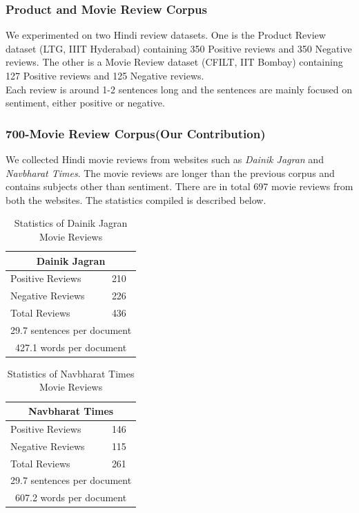\documentclass[11pt,a4paper]{article}
\begin{document}
\subsubsection{Product and Movie Review Corpus}
We experimented on two Hindi review datasets. One is the Product Review dataset (LTG, IIIT Hyderabad) containing 350 Positive reviews and 350 Negative reviews. The other is a Movie Review dataset (CFILT, IIT Bombay) containing 127 Positive reviews and 125 Negative reviews.\\
Each review is around 1-2 sentences long and the sentences are mainly focused on sentiment, either positive or negative.

\subsubsection{700-Movie Review Corpus(Our Contribution)}
\label{new_reviews}
We collected Hindi movie reviews from websites such as \emph{Dainik Jagran} and \emph{Navbharat Times}. The movie reviews are longer than the previous corpus and contains subjects other than sentiment.
There are in total 697 movie reviews from both the websites. The statistics compiled is described below.\\

\begin {table}[h!]
\large
\centering
\begin{tabular}{ |l|l| }
\hline
\multicolumn{2}{|c|}{\textbf{Dainik Jagran}} \\
\hline
Positive Reviews & 210 \\ 
Negative Reviews & 226 \\
Total Reviews & 436\\ \hline
\multicolumn{2}{|c|}{29.7 sentences per document} \\ \hline
\multicolumn{2}{|c|}{427.1 words per document} \\
\hline
\end{tabular}
\caption {Statistics of Dainik Jagran Movie Reviews}
\end{table}

\begin {table}[h!]
\large
\centering
\begin{tabular}{ |l|l| }
\hline
\multicolumn{2}{|c|}{\textbf{Navbharat Times}} \\
\hline
Positive Reviews & 146 \\ 
Negative Reviews & 115 \\
Total Reviews & 261\\ \hline
\multicolumn{2}{|c|}{29.7 sentences per document} \\ \hline
\multicolumn{2}{|c|}{607.2 words per document} \\
\hline
\end{tabular}
\caption {Statistics of Navbharat Times Movie Reviews}
\end{table}
\end{document}
